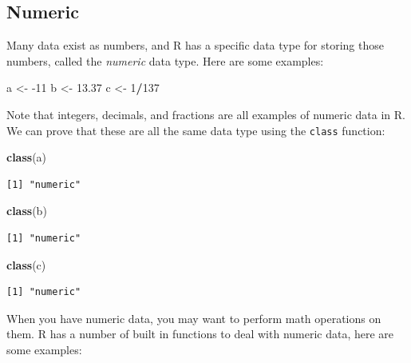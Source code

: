 \documentclass[
]{book}
\newenvironment{Shaded}{\begin{snugshade}}{\end{snugshade}}
\newcommand{\DecValTok}[1]{\textcolor[rgb]{0.00,0.00,0.81}{#1}}
\newcommand{\FloatTok}[1]{\textcolor[rgb]{0.00,0.00,0.81}{#1}}
\newcommand{\KeywordTok}[1]{\textcolor[rgb]{0.13,0.29,0.53}{\textbf{#1}}}
\newcommand{\NormalTok}[1]{#1}
\newcommand{\OperatorTok}[1]{\textcolor[rgb]{0.81,0.36,0.00}{\textbf{#1}}}
\newcommand{\StringTok}[1]{\textcolor[rgb]{0.31,0.60,0.02}{#1}}
\begin{document}
\hypertarget{numeric}{%
\subsection{Numeric}\label{numeric}}

Many data exist as numbers, and R has a specific data type for storing those numbers, called the \emph{numeric} data type.
Here are some examples:

\begin{Shaded}
\begin{Highlighting}[]
\NormalTok{a <-}\StringTok{ }\DecValTok{-11}
\NormalTok{b <-}\StringTok{ }\FloatTok{13.37}
\NormalTok{c <-}\StringTok{ }\DecValTok{1}\OperatorTok{/}\DecValTok{137}
\end{Highlighting}
\end{Shaded}

Note that integers, decimals, and fractions are all examples of numeric data in R.
We can prove that these are all the same data type using the \texttt{class} function:

\begin{Shaded}
\begin{Highlighting}[]
\KeywordTok{class}\NormalTok{(a)}
\end{Highlighting}
\end{Shaded}

\begin{verbatim}
[1] "numeric"
\end{verbatim}

\begin{Shaded}
\begin{Highlighting}[]
\KeywordTok{class}\NormalTok{(b)}
\end{Highlighting}
\end{Shaded}

\begin{verbatim}
[1] "numeric"
\end{verbatim}

\begin{Shaded}
\begin{Highlighting}[]
\KeywordTok{class}\NormalTok{(c)}
\end{Highlighting}
\end{Shaded}

\begin{verbatim}
[1] "numeric"
\end{verbatim}

When you have numeric data, you may want to perform math operations on them.
R has a number of built in functions to deal with numeric data, here are some examples:
\end{document}
